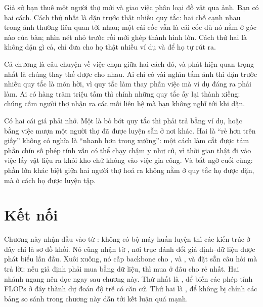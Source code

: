 \documentclass[../../deep_learning.tex]{subfiles}
\begin{document}
\begin{dongian}
Giả sử bạn thuê một người thợ mới và giao việc phân loại đồ vật qua ảnh. Bạn có hai cách. Cách thứ nhất là dặn trước thật nhiều quy tắc: hai chỗ cạnh nhau trong ảnh thường liên quan tới nhau; một cái cốc vẫn là cái cốc dù nó nằm ở góc nào của bàn; nhìn nét nhỏ trước rồi mới ghép thành hình lớn. Cách thứ hai là không dặn gì cả, chỉ đưa cho họ thật nhiều ví dụ và để họ tự rút ra.

Cả chương là câu chuyện về việc chọn giữa hai cách đó, và phát hiện quan trọng nhất là chúng thay thế được cho nhau. Ai chỉ có vài nghìn tấm ảnh thì dặn trước nhiều quy tắc là món hời, vì quy tắc làm thay phần việc mà ví dụ đáng ra phải làm. Ai có hàng trăm triệu tấm thì chính những quy tắc ấy lại thành xiềng: chúng cấm người thợ nhận ra các mối liên hệ mà bạn không nghĩ tới khi dặn.

Có hai cái giá phải nhớ. Một là bỏ bớt quy tắc thì phải trả bằng ví dụ, hoặc bằng việc mượn một người thợ đã được luyện sẵn ở nơi khác. Hai là ``rẻ hơn trên giấy'' không có nghĩa là ``nhanh hơn trong xưởng'': một cách làm cắt được tám phần chín số phép tính vẫn có thể chạy chậm y như cũ, vì thời gian thật đi vào việc lấy vật liệu ra khỏi kho chứ không vào việc gia công. Và bất ngờ cuối cùng: phần lớn khác biệt giữa hai người thợ hoá ra không nằm ở quy tắc họ được dặn, mà ở cách họ được luyện tập.
\end{dongian}

\section{Kết nối}
Chương này nhận đầu vào từ : không có bộ máy huấn luyện thì các kiến trúc ở đây chỉ là sơ đồ khối. Nó cũng nhận từ , nơi trục đánh đổi giả định--dữ liệu được phát biểu lần đầu. Xuôi xuống, nó cấp backbone cho ,  và , và đặt sẵn câu hỏi mà  trả lời: nếu giả định phải mua bằng dữ liệu, thì mua ở đâu cho rẻ nhất. Hai nhánh ngang nên đọc ngay sau chương này. Thứ nhất là , để biến các phép tính FLOPs ở đây thành dự đoán độ trễ có căn cứ. Thứ hai là , để không bị chính các bảng so sánh trong chương này dẫn tới kết luận quá mạnh.
\end{document}
